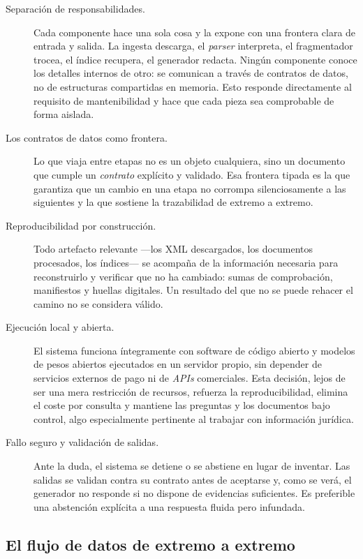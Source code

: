 \begin{description}
  \item[Separación de responsabilidades.] Cada componente hace una sola cosa y la expone con una frontera clara de entrada y salida. La ingesta descarga, el \emph{parser} interpreta, el fragmentador trocea, el índice recupera, el generador redacta. Ningún componente conoce los detalles internos de otro: se comunican a través de contratos de datos, no de estructuras compartidas en memoria. Esto responde directamente al requisito de mantenibilidad y hace que cada pieza sea comprobable de forma aislada.

  \item[Los contratos de datos como frontera.] Lo que viaja entre etapas no es un objeto cualquiera, sino un documento que cumple un \emph{contrato} explícito y validado. Esa frontera tipada es la que garantiza que un cambio en una etapa no corrompa silenciosamente a las siguientes y la que sostiene la trazabilidad de extremo a extremo.

  \item[Reproducibilidad por construcción.] Todo artefacto relevante —los XML descargados, los documentos procesados, los índices— se acompaña de la información necesaria para reconstruirlo y verificar que no ha cambiado: sumas de comprobación, manifiestos y huellas digitales. Un resultado del que no se puede rehacer el camino no se considera válido.

  \item[Ejecución local y abierta.] El sistema funciona íntegramente con software de código abierto y modelos de pesos abiertos ejecutados en un servidor propio, sin depender de servicios externos de pago ni de \emph{APIs} comerciales. Esta decisión, lejos de ser una mera restricción de recursos, refuerza la reproducibilidad, elimina el coste por consulta y mantiene las preguntas y los documentos bajo control, algo especialmente pertinente al trabajar con información jurídica.

  \item[Fallo seguro y validación de salidas.] Ante la duda, el sistema se detiene o se abstiene en lugar de inventar. Las salidas se validan contra su contrato antes de aceptarse y, como se verá, el generador no responde si no dispone de evidencias suficientes. Es preferible una abstención explícita a una respuesta fluida pero infundada.
\end{description}

\subsection{El flujo de datos de extremo a extremo}
\label{subsec:flujo-datos}

